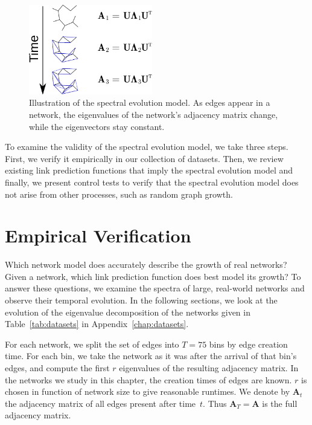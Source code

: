 \documentclass[11pt,a4paper]{book}
\newcommand{\wTwo}{0.48}
\newcommand{\totaltime}{T} %
\newcommand{\syRank}{r}
\begin{document}
\begin{figure}[h!]
  \centering
  \includegraphics[width=\wTwo\textwidth]{img-svg/sne-overview}
  \caption{
    Illustration of the spectral evolution model. 
    As edges appear in a network, the eigenvalues of the network's
    adjacency matrix change, while the eigenvectors stay constant. 
  }
  \label{fig:sne-overview}
\end{figure}

To examine the validity of the spectral evolution model, we 
take three steps.  First, we verify it empirically in our collection
of datasets.  Then, we review existing link prediction functions that
imply the spectral evolution model and finally, we present control tests
to verify that the spectral evolution model does not arise from other
processes, such as random graph growth. 

\section{Empirical Verification}
\label{sec:spectral-evolution-model:verification}
Which network model does accurately describe the growth of real networks?  Given
a network, which link prediction function does best model its growth?  To answer these
questions, we examine the spectra of large, real-world networks and
observe their temporal evolution.
In the following sections, we look at the evolution of the
eigenvalue decomposition of the networks given in
Table~\ref{tab:datasets} in Appendix~\ref{chap:datasets}. 

For each network, we split the set of edges into $\totaltime=75$ bins by
edge creation 
time.  For each bin, we take the network as it was after the arrival of
that bin's edges, and compute the first $\syRank$ eigenvalues of
the resulting adjacency matrix. 
In the networks we study in this chapter, 
the creation times of edges are known.  
$\syRank$ is
chosen in function of network size to give reasonable runtimes.
We denote by $\mathbf A_{t}$ the adjacency matrix of all edges present
after time~$t$.  Thus $\mathbf A_{\totaltime}=\mathbf A$ is the full
adjacency matrix. 
\end{document}

